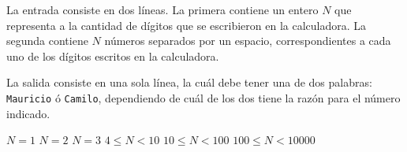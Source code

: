 \documentclass{oci}
\begin{document}
\begin{inputDescription}
  La entrada consiste en dos líneas.
  La primera contiene un entero $N$ que representa a la cantidad de dígitos que
  se escribieron en la calculadora.
  La segunda contiene $N$ números separados por un espacio, correspondientes a
  cada uno de los dígitos escritos en la calculadora.
\end{inputDescription}

\begin{outputDescription}
La salida consiste en una sola línea, la cuál debe tener una de dos palabras:
\texttt{Mauricio} ó \texttt{Camilo}, dependiendo de cuál de los dos tiene la
razón para el número indicado.
\end{outputDescription}

\begin{scoreDescription}
   $ N = 1$
   $ N = 2$
   $ N = 3$
   $ 4 \leq N < 10$
   $ 10 \leq N < 100$
   $ 100 \leq N < 10000$
\end{scoreDescription}

\begin{sampleDescription}
\end{sampleDescription}
\end{document}

